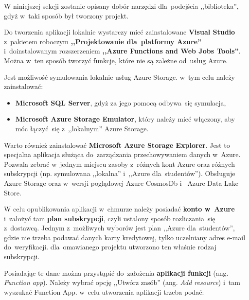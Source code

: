 \documentclass[12pt,a4paper,twoside,titlepage,openright]{book}
\begin{document}
W niniejszej sekcji zostanie opisany dobór narzędzi dla~podejścia ,,biblioteka'', gdyż w~taki sposób był tworzony projekt.

Do tworzenia aplikacji lokalnie wystarczy mieć zainstalowane \textbf{Visual Studio} z~pakietem roboczym \textbf{,,Projektowanie dla~platformy Azure''} i~doinstalowanym rozszerzeniem \textbf{,,Azure Functions and Web Jobs Tools''}. Można w~ten sposób tworzyć funkcje, które nie są zależne od~usług Azure.

Jest możliwość symulowania lokalnie usług Azure Storage. w~tym celu należy zainstalować:
\begin{itemize}
\item \textbf{Microsoft SQL Server}, gdyż za jego pomocą odbywa~się symulacja,
\item \textbf{Microsoft Azure Storage Emulator}, który należy mieć włączony, aby móc łączyć~się z~,,lokalnym'' Azure Storage.
\end{itemize}

Warto również zainstalować \textbf{Microsoft Azure Storage Explorer}. Jest to specjalna aplikacja służąca do~zarządzania przechowywaniem danych w~Azure. Pozwala zebrać w~jednym miejscu zasoby z~różnych kont Azure oraz różnych subskrypcji (np. symulowana ,,lokalna'' i~,,Azure dla~studentów''). Obsługuje Azure Storage oraz w~wersji poglądowej Azure CosmosDb i~ Azure Data Lake Store.

W celu opublikowania aplikacji w~chmurze należy posiadać \textbf{konto w~Azure} i~założyć tam \textbf{plan subskrypcji}, czyli ustalony sposób rozliczania~się z~dostawcą. Jednym z~możliwych wyborów jest plan ,,Azure dla~studentów'', gdzie nie trzeba podawać danych karty kredytowej, tylko uczelniany adres e-mail do~weryfikacji. dla~omawianego projektu utworzono ten właśnie rodzaj subskrypcji. 

Posiadając te dane można przystąpić do~założenia \textbf{aplikacji funkcji} (ang. \textit{Function app}). Należy wybrać opcję ,,Utwórz zasób'' (ang. \textit{Add resource}) i~tam wyszukać Function App. w~celu utworzenia aplikacji trzeba podać:
\end{document}
